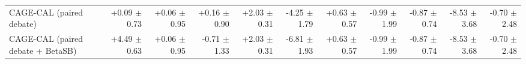 \begin{tabular}{lrrrrrrrrrr}
CAGE-CAL (paired debate) & +0.09 {\scriptsize $\pm$ 0.73} & +0.06 {\scriptsize $\pm$ 0.95} & +0.16 {\scriptsize $\pm$ 0.90} & +2.03 {\scriptsize $\pm$ 0.31} & -4.25 {\scriptsize $\pm$ 1.79} & +0.63 {\scriptsize $\pm$ 0.57} & -0.99 {\scriptsize $\pm$ 1.99} & -0.87 {\scriptsize $\pm$ 0.74} & -8.53 {\scriptsize $\pm$ 3.68} & -0.70 {\scriptsize $\pm$ 2.48} \\
CAGE-CAL (paired debate + BetaSB) & +4.49 {\scriptsize $\pm$ 0.63} & +0.06 {\scriptsize $\pm$ 0.95} & -0.71 {\scriptsize $\pm$ 1.33} & +2.03 {\scriptsize $\pm$ 0.31} & -6.81 {\scriptsize $\pm$ 1.93} & +0.63 {\scriptsize $\pm$ 0.57} & -0.99 {\scriptsize $\pm$ 1.99} & -0.87 {\scriptsize $\pm$ 0.74} & -8.53 {\scriptsize $\pm$ 3.68} & -0.70 {\scriptsize $\pm$ 2.48} \\
\bottomrule
\end{tabular}
